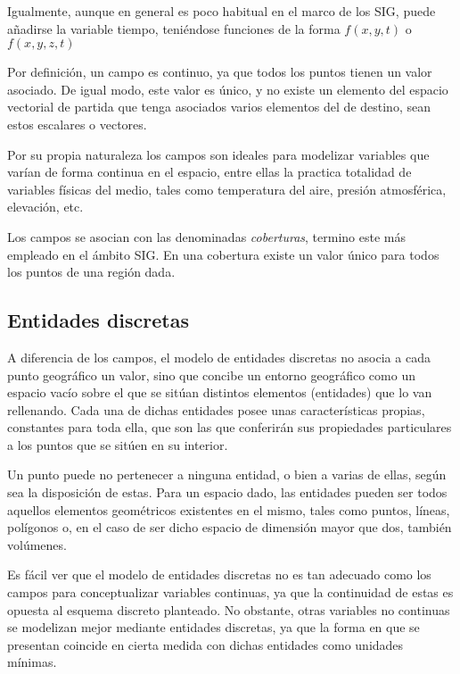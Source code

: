 \begin{multicols}{2}
Igualmente, aunque en general es poco habitual en el marco de los SIG, puede añadirse la variable tiempo, teniéndose funciones de la forma $f(x,y,t)$ o $f(x,y,z,t)$

Por definición, un campo es continuo, ya que todos los puntos tienen un valor asociado. De igual modo, este valor es único, y no existe un elemento del espacio vectorial de partida que tenga asociados varios elementos del de destino, sean estos escalares o vectores.

Por su propia naturaleza los campos son ideales para modelizar variables que varían de forma continua en el espacio, entre ellas la practica totalidad de variables físicas del medio, tales como temperatura del aire, presión atmosférica, elevación, etc.

Los campos se asocian con las denominadas \emph{coberturas}, termino este más empleado en el ámbito SIG. En una cobertura existe un valor único para todos los puntos de una región dada.

\subsection{Entidades discretas}

A diferencia de los campos, el modelo de entidades discretas no asocia a cada punto geográfico un valor, sino que concibe un entorno geográfico como un espacio vacío sobre el que se sitúan distintos elementos (entidades) que lo van rellenando. Cada una de dichas entidades posee unas características propias, constantes para toda ella, que son las que conferirán sus propiedades particulares a los puntos que se sitúen en su interior.

Un punto puede no pertenecer a ninguna entidad, o bien a varias de ellas, según sea la disposición de estas. Para un espacio dado, las entidades pueden ser todos aquellos elementos geométricos existentes en el mismo, tales como puntos, líneas, polígonos o, en el caso de ser dicho espacio de dimensión mayor que dos, también volúmenes.

Es fácil ver que el modelo de entidades discretas no es tan adecuado como los campos para conceptualizar variables continuas, ya que la continuidad de estas es opuesta al esquema discreto planteado. No obstante, otras variables no continuas se modelizan mejor mediante entidades discretas, ya que la forma en que se presentan coincide en cierta medida con dichas entidades como unidades mínimas. 


\end{multicols}
